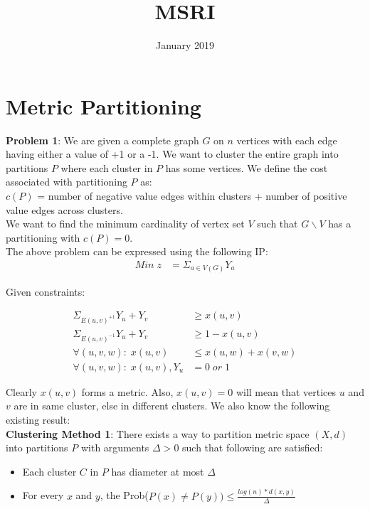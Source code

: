 \documentclass{article}
\title{MSRI}
\date{January 2019}
\begin{document}
\maketitle

\section{Metric Partitioning}

\textbf{Problem 1}: We are given a complete graph $G$ on $n$ vertices with each edge having either a value of +1 or a -1. We want to cluster the entire graph into partitions $P$ where each cluster in $P$ has some vertices. We define the cost associated with partitioning $P$ as:\\
$c(P)$ = number of negative value edges within clusters + number of positive value edges across clusters.\\ We want to find the minimum cardinality of vertex set $V$ such that $G\backslash V$ has a partitioning with $c(P)=0$.
\\
The above problem can be expressed using the following IP:
\begin{align*}
Min\; z &= \Sigma_{a\in V(G)} Y_{a}
\end{align*}
\begin{flushleft}
Given constraints:
\end{flushleft}
\begin{align*}
\Sigma_{E(u,v)^{+1}} Y_{u} + Y_{v} &\geq x(u,v)\\
\Sigma_{E(u,v)^{-1}} Y_{u} + Y_{v} &\geq 1-x(u,v)\\
\forall(u,v,w):\; x(u,v)&\leq x(u,w) +  x(v,w)\\
\forall(u,v,w):\; x(u,v), Y_{u} &= 0 \;or \;1
\end{align*}

Clearly $x(u,v)$ forms a metric. Also, $x(u,v)=0$ will mean that vertices $u$ and $v$ are in same cluster, else in different clusters.
We also know the following existing result:\\


\textbf{Clustering Method 1}: There exists a way to partition metric space $(X,d)$ into partitions $P$ with arguments $\Delta>0$ such that following are satisfied:
\begin{itemize}
    \item Each cluster $C$ in $P$ has diameter at most $\Delta$
    \item For every $x$ and $y$, the Prob($P(x)\neq P(y)) \leq  \frac{log(n)*d(x,y)}{\Delta}$ 
\end{itemize}
\end{document}
